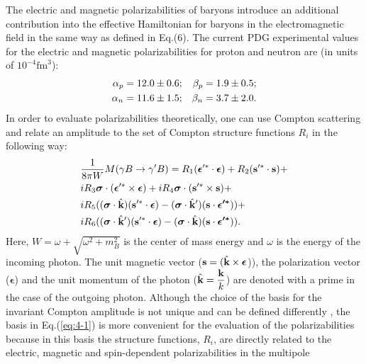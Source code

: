 \documentclass[3p,times,twocolumn]{revtex4}
\begin{document}
The electric and magnetic polarizabilities of baryons introduce an
additional contribution into the effective Hamiltonian for baryons in the
electromagnetic field in the same way as defined in Eq.(6). 
The current PDG \cite{PDG} experimental values for the
electric and magnetic polarizabilities for proton and neutron are (in units of $10^{-4} \mbox{fm}^3$):
\begin{eqnarray*}
\alpha_{p}=12.0\pm0.6; &  & \beta_{p}=1.9\pm0.5;\\
\alpha_{n}=11.6\pm1.5; &  & \beta_{n}=3.7\pm2.0 \space .
\end{eqnarray*}
In order to evaluate polarizabilities theoretically, one can use Compton
scattering and relate an amplitude to the set of Compton structure
functions $R_{i}$ \cite{Babusci} in the following way:
\begin{eqnarray}
&\displaystyle{\frac{1}{8\pi W}}M(\gamma B\rightarrow\gamma'B) =  R_{1}(\boldsymbol{\epsilon}{}^{\prime*}\cdot\boldsymbol{\epsilon})+R_{2}({\bf s}{}^{\prime*}\cdot{\bf s})+ \nonumber \\
&iR_{3}\boldsymbol{\sigma}\cdot(\boldsymbol{\epsilon}{}^{\prime*}\times\boldsymbol{\epsilon})+iR_{4}\boldsymbol{\sigma}\cdot({\bf s}{}^{\prime*}\times{\bf s})+\nonumber \\
&iR_{5}((\boldsymbol{\sigma}\cdot\hat{{\bf k}})({\bf s^{\prime*}}\cdot\boldsymbol{\epsilon})-(\boldsymbol{\sigma}\cdot\hat{{\bf k}}^{\prime})({\bf s}\cdot\boldsymbol{\epsilon^{\prime*}}))+\nonumber \\
&iR_{6}((\boldsymbol{\sigma}\cdot\hat{{\bf k}}^{\prime})({\bf {\bf s^{\prime*}}}\cdot\boldsymbol{\epsilon})-(\boldsymbol{\sigma}\cdot\hat{{\bf k}})({\bf s}\cdot\boldsymbol{\epsilon^{\prime*}})) \space . \label{eq:4-1}
\end{eqnarray}
Here, $W=\omega+\sqrt{\omega^{2}+m_{B}^{2}}$ is the center of mass
energy and $\omega$ is the energy of the incoming photon. The unit magnetic
vector (${\bf s}=(\hat{{\bf k}}\times\boldsymbol{\epsilon}$)), the polarization
vector ($\boldsymbol{\epsilon}$) and the unit momentum of the photon
(${\displaystyle \hat{{\bf k}}=\frac{{\bf k}}{k}}$) are denoted with
a prime in the case of the outgoing photon. Although the choice
of the basis for the invariant Compton amplitude is not unique and
can be defined differently \cite{Babusci}, the basis in Eq.(\ref{eq:4-1}) is more convenient for the evaluation of the polarizabilities
because in this basis the structure functions, $R_{i}$, are directly related to the
electric, magnetic and spin-dependent polarizabilities in the multipole
\end{document}
